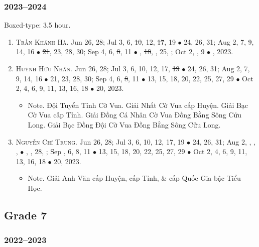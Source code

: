 \documentclass{article}
\begin{document}
\subsubsection{2023--2024}
Boxed-type: 3.5 hour.
\begin{enumerate}
	\item \textsc{Trần Khánh Hà.} {\sf[In]} Jun 26, 28; Jul 3, 6, \st{10}, 12, \st{17}, 19 $\bullet$ 24, 26, 31; Aug 2, 7, \st{9}, 14, 16 $\bullet$ \st{21}, 23, 28, 30; Sep 4, 6, \st{8}, 11 $\bullet$ , \st{18}, , 25, ; Oct 2, , 9 $\bullet$ , 2023.
	\item \textsc{Huỳnh Hữu Nhân.} {\sf[In]} Jun 26, 28; Jul 3, 6, 10, 12, 17, \st{19} $\bullet$ 24, 26, 31; Aug 2, 7, 9, 14, 16 $\bullet$ 21, 23, 28, 30; Sep 4, 6, \st{8}, 11 $\bullet$ 13, 15, 18, 20, 22, 25, 27, 29 $\bullet$ Oct 2, 4, 6, 9, 11, 13, 16, 18 $\bullet$ 20, 2023.
	\begin{itemize}
		\item {\sf Note.} Đội Tuyển Tỉnh Cờ Vua. Giải Nhất Cờ Vua cấp Huyện. Giải Bạc Cờ Vua cấp Tỉnh. Giải Đồng Cá Nhân Cờ Vua Đồng Bằng Sông Cửu Long. Giải Bạc Đồng Đội Cờ Vua Đồng Bằng Sông Cửu Long.
	\end{itemize}
	\item \textsc{Nguyễn Chí Trung.} {\sf[In]} Jun 26, 28; Jul 3, 6, 10, 12, 17, 19 $\bullet$ 24, 26, 31; Aug 2, , , ,  $\bullet$ , , 28, ; Sep , 6, 8, 11 $\bullet$ 13, 15, 18, 20, 22, 25, 27, 29 $\bullet$ Oct 2, 4, 6, 9, 11, 13, 16, 18 $\bullet$ 20, 2023.
	\begin{itemize}
		\item {\sf Note.} Giải Anh Văn cấp Huyện, cấp Tỉnh, \& cấp Quốc Gia bậc Tiểu Học.
	\end{itemize}
\end{enumerate}

\subsection{Grade 7}

\subsubsection{2022--2023}
\end{document}
